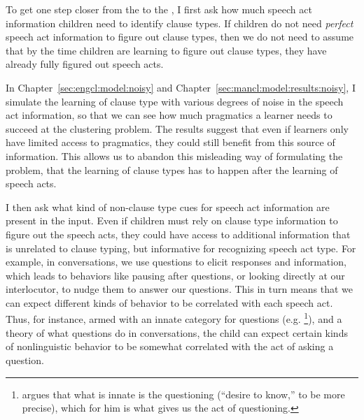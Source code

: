 To get one step closer from the \subhypos{} to the \tbf{\hypos{}}, I first ask how much speech act information children need to identify clause types. If children do not need \emph{perfect} speech act information to figure out clause types, then we do not need to assume that by the time children are learning to figure out clause types, they have already fully figured out speech acts. %

In Chapter~\ref{sec:engcl:model:noisy} and Chapter~\ref{sec:mancl:model:results:noisy}, I simulate the learning of clause type with various degrees of noise in the speech act information, so that we can see how much pragmatics a learner needs to succeed at the clustering problem. The results suggest that even if learners only have limited access to pragmatics, they could still benefit from this source of information. This allows us to abandon this misleading way of formulating the problem, that the learning of clause types has to happen after the learning of speech acts.

I then %
ask what kind of non-clause type cues for speech act information are present in the input. Even if children must rely on clause type information to figure out the speech acts, they could have access to additional information that is unrelated to clause typing, but informative for recognizing speech act type. For example, in conversations, we use questions to elicit responses and information, which leads to behaviors like pausing after questions, or looking directly at our interlocutor, to nudge them to answer our questions. 
This in turn means that we can expect different kinds of behavior to be correlated with each speech act. Thus, for instance, armed with an innate category for questions (e.g. \cite{carruthers2018q}\footnote{\textcite{carruthers2018q} argues that what is innate is the questioning  (``desire to know,'' to be more precise), which for him is what gives us the act of questioning.  }), and a theory of what questions do in conversations, the child can expect certain kinds of nonlinguistic behavior to be somewhat correlated with the act of asking a question. 

